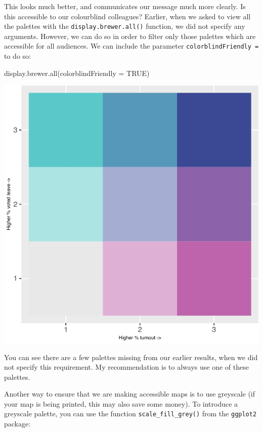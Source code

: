 \documentclass[
]{book}
\newenvironment{Shaded}{\begin{snugshade}}{\end{snugshade}}
\newcommand{\AttributeTok}[1]{\textcolor[rgb]{0.77,0.63,0.00}{#1}}
\newcommand{\ConstantTok}[1]{\textcolor[rgb]{0.00,0.00,0.00}{#1}}
\newcommand{\FunctionTok}[1]{\textcolor[rgb]{0.00,0.00,0.00}{#1}}
\newcommand{\NormalTok}[1]{#1}
\begin{document}
This looks much better, and communicates our message much more clearly. Is this accessible to our colourblind colleagues? Earlier, when we asked to view all the palettes with the \texttt{display.brewer.all()} function, we did not specify any arguments. However, we can do so in order to filter only those palettes which are accessible for all audiences. We can include the parameter \texttt{colorblindFriendly\ =} to do so:

\begin{Shaded}
\begin{Highlighting}[]
\FunctionTok{display.brewer.all}\NormalTok{(}\AttributeTok{colorblindFriendly =} \ConstantTok{TRUE}\NormalTok{)}
\end{Highlighting}
\end{Shaded}

\includegraphics{crime_mapping_files/figure-latex/unnamed-chunk-149-1.pdf}

You can see there are a few palettes missing from our earlier results, when we did not specify this requirement. My recommendation is to always use one of these palettes.

Another way to ensure that we are making accessible maps is to use greyscale (if your map is being printed, this may also save some money). To introduce a greyscale palette, you can use the function \texttt{scale\_fill\_grey()} from the \texttt{ggplot2} package:
\end{document}
